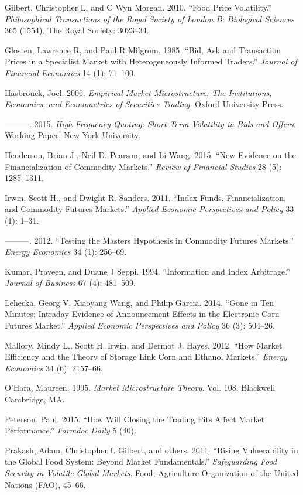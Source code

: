 \documentclass[review,12pt]{elsarticle}
\begin{document}
Gilbert, Christopher L, and C Wyn Morgan. 2010. ``Food Price
Volatility.'' \emph{Philosophical Transactions of the Royal Society of
London B: Biological Sciences} 365 (1554). The Royal Society: 3023--34.

Glosten, Lawrence R, and Paul R Milgrom. 1985. ``Bid, Ask and
Transaction Prices in a Specialist Market with Heterogeneously Informed
Traders.'' \emph{Journal of Financial Economics} 14 (1): 71--100.

Hasbrouck, Joel. 2006. \emph{Empirical Market Microstructure: The
Institutions, Economics, and Econometrics of Securities Trading}. Oxford
University Press.

---------. 2015. \emph{High Frequency Quoting: Short-Term Volatility in
Bids and Offers}. Working Paper. New York University.

Henderson, Brian J., Neil D. Pearson, and Li Wang. 2015. ``New Evidence
on the Financialization of Commodity Markets.'' \emph{Review of
Financial Studies} 28 (5): 1285--1311.

Irwin, Scott H., and Dwight R. Sanders. 2011. ``Index Funds,
Financialization, and Commodity Futures Markets.'' \emph{Applied
Economic Perspectives and Policy} 33 (1): 1--31.

---------. 2012. ``Testing the Masters Hypothesis in Commodity Futures
Markets.'' \emph{Energy Economics} 34 (1): 256--69.

Kumar, Praveen, and Duane J Seppi. 1994. ``Information and Index
Arbitrage.'' \emph{Journal of Business} 67 (4): 481--509.

Lehecka, Georg V, Xiaoyang Wang, and Philip Garcia. 2014. ``Gone in Ten
Minutes: Intraday Evidence of Announcement Effects in the Electronic
Corn Futures Market.'' \emph{Applied Economic Perspectives and Policy}
36 (3): 504--26.

Mallory, Mindy L., Scott H. Irwin, and Dermot J. Hayes. 2012. ``How
Market Efficiency and the Theory of Storage Link Corn and Ethanol
Markets.'' \emph{Energy Economics} 34 (6): 2157--66.

O'Hara, Maureen. 1995. \emph{Market Microstructure Theory}. Vol. 108.
Blackwell Cambridge, MA.

Peterson, Paul. 2015. ``How Will Closing the Trading Pits Affect Market
Performance.'' \emph{Farmdoc Daily} 5 (40).

Prakash, Adam, Christopher L Gilbert, and others. 2011. ``Rising
Vulnerability in the Global Food System: Beyond Market Fundamentals.''
\emph{Safeguarding Food Security in Volatile Global Markets}. Food;
Agriculture Organization of the United Nations (FAO), 45--66.
\end{document}
